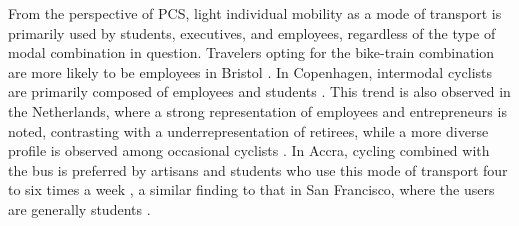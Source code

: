 \begin{refsegment}
From the perspective of \acrshort{PCS}, light individual mobility as a mode of transport is primarily used by students, executives, and employees, regardless of the type of modal combination in question. Travelers opting for the bike-train combination are more likely to be employees in Bristol \textcolor{blue}{\autocite[192]{sherwin_practices_2011}}. In Copenhagen, intermodal cyclists are primarily composed of employees and students \textcolor{blue}{\autocite[21]{halldorsdottir_home-end_2017}}. This trend is also observed in the Netherlands, where a strong representation of employees and entrepreneurs is noted, contrasting with a underrepresentation of retirees, while a more diverse profile is observed among occasional cyclists \textcolor{blue}{\autocite[9]{jonkeren_bicycle-train_2021}}. In Accra, cycling combined with the bus is preferred by artisans and students who use this mode of transport four to six times a week \textcolor{blue}{\autocite[112]{quarshie_integrating_2007}}, a similar finding to that in San Francisco, where the users are generally students \textcolor{blue}{\autocite[94]{cervero_bike-and-ride_2013}}.%


\end{refsegment}
